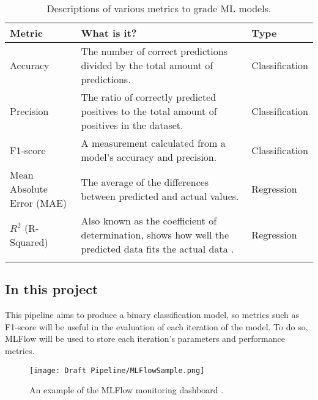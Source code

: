 \begin{longtable}{ |p{}| p{}| p{}|}
    \hline
    \cellcolor{blue!25}Metric & \cellcolor{blue!25}What is it? & \cellcolor{blue!25}Type\\
    \hline
    Accuracy & The number of correct predictions divided by the total amount of predictions. & Classification\\
    \hline
    Precision & The ratio of correctly predicted positives to the total amount of positives in the dataset. 
    & Classification \\
    \hline
    F1-score & A measurement calculated from a model's accuracy and precision.\autocite{kundu_f1_nodate} & Classification\\
    \hline
    Mean Absolute Error (MAE) & The average of the differences between predicted and actual values. & Regression\\
    \hline
    $R^2$ (R-Squared) & Also known as the coefficient of determination, shows how well the predicted data fits the 
    actual data \autocite{cfi_r-squared_nodate}. & Regression \\
    \hline
\caption{Descriptions of various metrics to grade ML models.}\label{tab:metrics}
\end{longtable}


\subsection{In this project}
This pipeline aims to produce a binary classification model, so metrics such as F1-score will be useful in the evaluation
of each iteration of the model. To do so, MLFlow will be used to store each iteration's parameters and performance
metrics. 

\begin{figure}[H]
    \centering
    \texttt{[image: Draft Pipeline/MLFlowSample.png]}
    \caption{An example of the MLFlow monitoring dashboard \autocite{mlflow_mlflow_nodate}.}
    \label{fig:MLFlowSample}
\end{figure}



